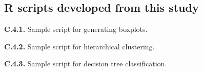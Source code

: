 \begin{appendices}
\section{R scripts developed from this study}
\label{app: appendix-scripts}

\flushleft \textbf{C.4.1.} Sample script for generating boxplots.\\
\begin{singlespace}
	
\end{singlespace}
\newpage

\flushleft \textbf{C.4.2.} Sample script for hierarchical clustering.\\
\begin{singlespace}
	
\end{singlespace}
\newpage

\flushleft \textbf{C.4.3.} Sample script for decision tree classification.\\
\begin{singlespace}
	
\end{singlespace}


\end{appendices}

